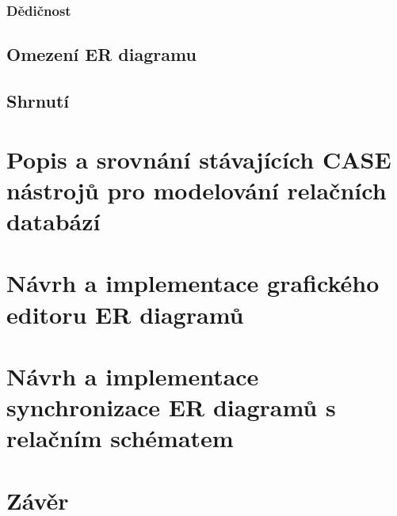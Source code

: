 \documentclass[czech,bachelor,public,dept460,male,oneside]{diploma}
\begin{document}
	\subsubsection{Dědičnost} %
	
	\subsection{Omezení ER diagramu}
	
	\subsection{Shrnutí}

\newpage
\section{Popis a srovnání stávajících CASE nástrojů pro modelování relačních databází}

\newpage
\section{Návrh a implementace grafického editoru ER diagramů}

\newpage
\section{Návrh a implementace synchronizace ER diagramů s relačním schématem}

\newpage
\section{Závěr}

\newpage
\end{document}
